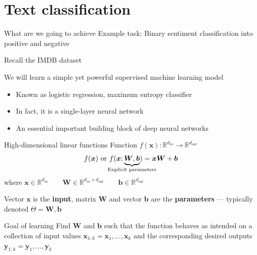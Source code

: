 \documentclass[12pt,aspectratio=169,handout]{beamer}
\begin{document}
\section{Text classification}

\begin{frame}{What are we going to achieve}
Example task: Binary sentiment classification into positive and negative

Recall the IMDB dataset

We will learn a simple yet powerful supervised machine learning model

\begin{itemize}
	\item Known as logistic regression, maximum entropy classifier
	\item In fact, it is a single-layer neural network
	\item An essential important building block of deep neural networks
\end{itemize}


\end{frame}



\begin{frame}{High-dimensional linear functions}
Function $f(\bm{x}) : \mathbb{R}^{d_{in}} \to \mathbb{R}^{d_{out}}$
$$f(\bm{x}) \text{ or }
f(\bm{x}; \underbrace{\bm{W}, \bm{b}}_{\mathclap{\text{Explicit parameters}}})
= \bm{x} \bm{W} + \bm{b}$$
where
$\bm{x} \in \mathbb{R}^{d_{in}} \qquad
\bm{W} \in \mathbb{R}^{d_{in} \times d_{out}} \qquad
\bm{b} \in \mathbb{R}^{d_{out}}$

Vector $\bm{x}$ is the \textbf{input}, matrix $\bm{W}$ and vector $\bm{b}$ are the \textbf{parameters} --- typically denoted $\Theta = \bm{W}, \bm{b}$

\begin{block}{Goal of learning}
Find $\bm{W}$ and $\bm{b}$ such that
the function behaves as intended on a collection of input values
$\bm{x}_{1:k} = \bm{x}_1, \ldots, \bm{x}_k$ 
and the corresponding desired outputs
$\bm{y}_{1:k} = \bm{y}_1, \ldots, \bm{y}_k$
\end{block}

\end{frame}
\end{document}
